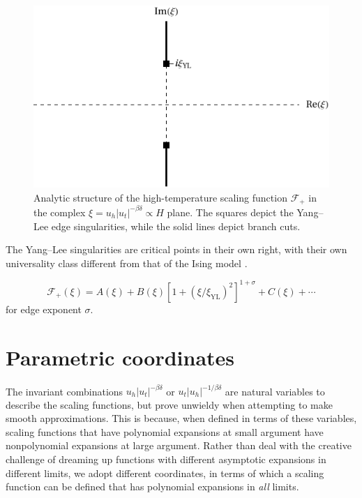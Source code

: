 \documentclass[
  aps,
  pre,
  preprint,
  longbibliography,
  floatfix
]{revtex4-2}
\begin{document}
\begin{figure}
  \includegraphics{figs/F_higher_singularities.pdf}
  \caption{
    Analytic structure of the high-temperature scaling function $\mathcal F_+$
    in the complex $\xi=u_h|u_t|^{-\beta\delta}\propto H$ plane. The squares
    depict the Yang--Lee edge singularities, while the solid lines depict
    branch cuts.
  } \label{fig:higher.singularities}
\end{figure}

The Yang--Lee singularities are critical points in their own right, with their own universality class different from that of the Ising model \cite{Fisher_1978_Yang-Lee}.

\begin{equation}
  \mathcal F_+(\xi)
  =A(\xi) +B(\xi)[1+(\xi/\xi_{\mathrm{YL}})^2]^{1+\sigma}+C(\xi)+\cdots
\end{equation}
for edge exponent $\sigma$.

\cite{Cardy_1985_Conformal}
\cite{Connelly_2020_Universal}
\cite{An_2016_Functional}
\cite{Zambelli_2017_Lee-Yang}
\cite{Gliozzi_2014_Critical}

\section{Parametric coordinates}

The invariant combinations $u_h|u_t|^{-\beta\delta}$ or
$u_t|u_h|^{-1/\beta\delta}$ are natural variables to describe the scaling
functions, but prove unwieldy when attempting to make smooth approximations.
This is because, when defined in terms of these variables, scaling functions
that have polynomial expansions at small argument have nonpolynomial expansions
at large argument. Rather than deal with the creative challenge of dreaming up
functions with different asymptotic expansions in different limits, we adopt
different coordinates, in terms of which a scaling function can be defined that
has polynomial expansions in \emph{all} limits.
\end{document}
